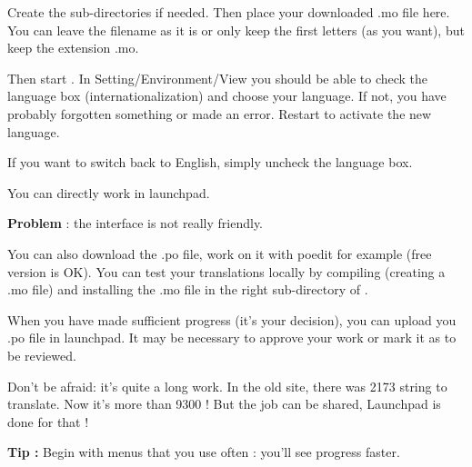 Create the sub-directories if needed. Then place your downloaded .mo file here. You can leave the filename as it is or only keep the first letters (as you want), but keep the extension .mo.

Then start \codeblocks. In Setting/Environment/View you should be able to check the language box (internationalization) and choose your language. If not, you have probably forgotten something or made an error.\newline
Restart \codeblocks to activate the new language.

If you want to switch back to English, simply uncheck the language box.

You can directly work in launchpad.

\textbf{Problem} : the interface is not really friendly.

You can also download the .po file, work on it with poedit for example (free version is OK). You can test your translations locally by compiling (creating a .mo file) and installing the .mo file in the right sub-directory of \codeblocks.

When you have made sufficient progress (it's your decision), you can upload you .po file in launchpad. It may be necessary to approve your work or mark it as to be reviewed.

Don't be afraid: it's quite a long work. In the old site, there was 2173 string to translate. Now it's more than 9300 ! But the job can be shared, Launchpad is done for that !

\textbf{Tip :} Begin with menus that you use often : you'll see progress faster.

